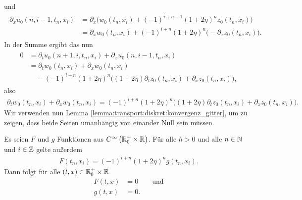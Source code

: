und
\begin{align}
\begin{split}
\partial_x u_0(n, i-1, t_n, x_i) &= \partial_x \bigl( w_0(t_n, x_i) + (-1)^{i+n-1} (1 + 2\eta)^n z_0(t_n, x_i) \bigr)\\
&= \partial_x w_0(t_n, x_i) + (-1)^{i+n} (1 + 2\eta)^n \bigl( - \partial_x z_0(t_n, x_i) \bigr).
\end{split}
\end{align}
In der Summe ergibt das nun
\begin{align}\label{alt:summe1}
\begin{split}
0 &= \partial_t u_0(n+1, i, t_n, x_i) + \partial_x u_0(n, i-1, t_n, x_i)\\
&= \partial_t w_0(t_n, x_i) + \partial_x w_0(t_n, x_i)\\
&\quad - (-1)^{i+n} (1 + 2\eta)^n \bigl( (1 + 2 \eta) \partial_t z_0(t_n, x_i) + \partial_x z_0(t_n, x_i) \bigr),
\end{split}
\end{align}
also
\begin{align}\label{eq:apx:beidenull1}
\partial_t w_0(t_n, x_i) + \partial_x w_0(t_n, x_i) = (-1)^{i+n} (1 + 2\eta)^n \bigl( (1 + 2 \eta) \partial_t z_0(t_n, x_i) + \partial_x z_0(t_n, x_i) \bigr).
\end{align}
Wir verwenden nun Lemma \ref{lemma:transport:diskret:konvergenz_gitter}, um zu zeigen, dass beide Seiten umanhängig von einander Null sein müssen.
\begin{satz}\label{satz:alt:beidenull}
Es seien $F$ und $g$ Funktionen aus $C^{\infty}\left( \mathbb R^+_0 \times \mathbb R \right)$. Für alle $h > 0$ und alle $n \in \mathbb N$ und $i \in \mathbb Z$ gelte außerdem
\begin{align}\label{eq:apx:beidenull}
F(t_n,x_i) = (-1)^{i+n} (1 + 2\eta)^n g(t_n,x_i).
\end{align}
Dann folgt für alle $(t,x) \in \mathbb R^+_0 \times \mathbb R$
\begin{align*}
F(t,x) &= 0 \qquad \text{und}\\ 
g(t,x) &= 0. 
\end{align*} 
\end{satz}
